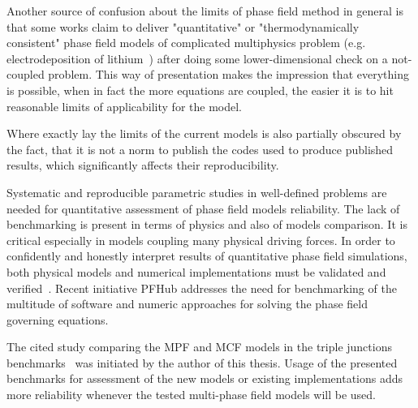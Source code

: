 Another source of confusion about the limits of phase field method in general is that some works claim to deliver "quantitative" or "thermodynamically consistent" phase field models of complicated multiphysics problem (e.g. electrodeposition of lithium~\cite{Chen2015}) after doing some lower-dimensional check on a not-coupled problem. This way of presentation makes the impression that everything is possible, when in fact the more equations are coupled, the easier it is to hit reasonable limits of applicability for the model.

Where exactly lay the limits of the current models is also partially obscured by the fact, that it is not a norm to publish the codes used to produce published results, which significantly affects their reproducibility. 

Systematic and reproducible parametric studies in well-defined problems are needed for quantitative assessment of phase field models reliability. The lack of benchmarking is present in terms of physics and also of models comparison. It is critical especially in models coupling many physical driving forces. In order to confidently and honestly interpret results of quantitative phase field simulations, both physical models and numerical implementations must be validated and verified~\cite{Jokisaari2017}. Recent initiative PFHub addresses the need for benchmarking of the multitude of software and numeric approaches for solving the phase field governing equations. 

The cited study comparing the MPF and MCF models in the triple junctions benchmarks~\cite{Daubner2023} was initiated by the author of this thesis. Usage of the presented benchmarks for assessment of the new models or existing implementations adds more reliability whenever the tested multi-phase field models will be used.

\cleardoublepage

